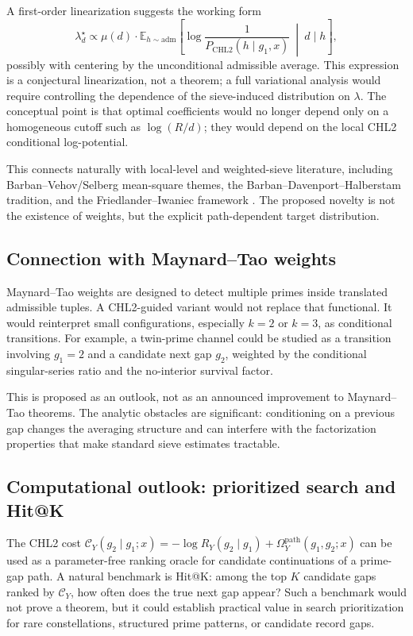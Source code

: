 \documentclass[10pt]{article}
\newcommand{\CHLtwo}{\mathrm{CHL2}}
\newcommand{\Omegapath}{\Omega_Y^{\mathrm{path}}}
\begin{document}
A first-order linearization suggests the working form
\[
\lambda_d^\star \propto \mu(d)\cdot \mathbb{E}_{h\sim\mathrm{adm}}\!\left[\log\frac{1}{P_{\CHLtwo}(h\mid g_1,x)}\ \middle|\ d\mid h\right],
\]
possibly with centering by the unconditional admissible average. This expression is a conjectural linearization, not a theorem; a full variational analysis would require controlling the dependence of the sieve-induced distribution on $\lambda$. The conceptual point is that optimal coefficients would no longer depend only on a homogeneous cutoff such as $\log(R/d)$; they would depend on the local CHL2 conditional log-potential.

This connects naturally with local-level and weighted-sieve literature, including Barban--Vehov/Selberg mean-square themes, the Barban--Davenport--Halberstam tradition, and the Friedlander--Iwaniec framework \cite{barban1961,barban-vehov,bfi1986,friedlander-iwaniec}. The proposed novelty is not the existence of weights, but the explicit path-dependent target distribution.
\subsection{Connection with Maynard--Tao weights}
Maynard--Tao weights are designed to detect multiple primes inside translated admissible tuples. A CHL2-guided variant would not replace that functional. It would reinterpret small configurations, especially $k=2$ or $k=3$, as conditional transitions. For example, a twin-prime channel could be studied as a transition involving $g_1=2$ and a candidate next gap $g_2$, weighted by the conditional singular-series ratio and the no-interior survival factor.

This is proposed as an outlook, not as an announced improvement to Maynard--Tao theorems. The analytic obstacles are significant: conditioning on a previous gap changes the averaging structure and can interfere with the factorization properties that make standard sieve estimates tractable.
\subsection{Computational outlook: prioritized search and Hit@K}
The CHL2 cost $\mathcal C_Y(g_2\mid g_1;x)=-\log R_Y(g_2\mid g_1)+\Omegapath(g_1,g_2;x)$ can be used as a parameter-free ranking oracle for candidate continuations of a prime-gap path. A natural benchmark is Hit@K: among the top $K$ candidate gaps ranked by $\mathcal C_Y$, how often does the true next gap appear? Such a benchmark would not prove a theorem, but it could establish practical value in search prioritization for rare constellations, structured prime patterns, or candidate record gaps.
\appendix
\renewcommand{\thesection}{Appendix \Alph{section}:}
\end{document}
